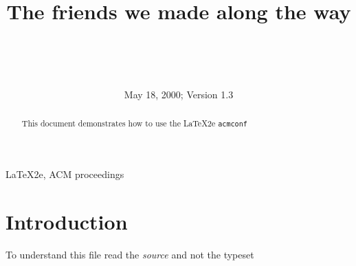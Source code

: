 \documentclass[print]{acmconf}
\begin{document}
\date{May 18, 2000; Version 1.3}
\title{The friends we made along the way}
\author{\\
\\
\\
}
\maketitle
\begin{abstract}
This document demonstrates how to use the \LaTeX2e \verb|acmconf|
\end{abstract}
\begin{keywords}
\LaTeX2e, ACM proceedings
\end{keywords}
\section{Introduction}
To understand this file read the \emph{source} and not the typeset
\end{document}
